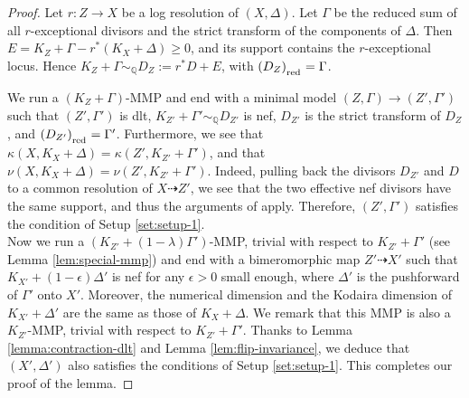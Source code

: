 \documentclass[12pt]{amsart}
\newcommand{\mbQ}{\mathbb{Q}}
\newcommand{\<}{\leq}
\def\>{\geq}
\newcommand{\bir}{\dashrightarrow}
\newcommand{\D}{\Delta}
\theoremstyle{remark}
\theoremstyle{definition}
\theoremstyle{definition}
\numberwithin{equation}{section}
\theoremstyle{definition}
\theoremstyle{definition}
\def\red{\operatorname{\textsubscript{\rm red}}}
\begin{document}
\begin{proof}
Let $r\colon Z\to X$ be a log resolution of $(X,\Delta)$. 
Let $\Gamma$ be the reduced sum of all $r$-exceptional divisors and the strict transform of the components of $\Delta$. 
Then $E = K_Z+\Gamma - r^*(K_X+\Delta) \> 0$, and its support contains the $r$-exceptional locus. 
Hence  $K_Z+\Gamma \sim_\mathbb{Q} D_Z := r^*D + E$, with $(D_Z)_{\red} = \Gamma$. 

 
We run a $(K_Z+\Gamma)$-MMP and end with a minimal model $(Z, \Gamma)\to (Z', \Gamma')$ such that $(Z',\Gamma')$ is dlt, $K_{Z'}+\Gamma'\sim_{\mbQ} D_{Z'}$ is nef,    $D_{Z'}$ is the strict transform of $D_Z$,   
and $(D_{Z'})_{\red} = \Gamma'$. 
Furthermore, we see that   $\kappa(X, K_X+\Delta) = \kappa(Z', K_{Z'}+\Gamma')$, and that $\nu(X, K_X+\Delta) = \nu(Z', K_{Z'}+\Gamma')$. 
Indeed,  pulling back the   divisors $D_{Z'}$ and $D$ to a common resolution of $X\bir Z'$, 
we see that the two effective nef divisors have the same support, 
and thus the arguments of \cite[Lemma 11.3.3]{Kol92} apply.  
Therefore, $(Z',\Gamma')$ satisfies the condition of Setup \ref{set:setup-1}. 
\\

Now we run a $(K_{Z'}+(1-\lambda)\Gamma')$-MMP, trivial with respect to $K_{Z'}+\Gamma'$ (see Lemma  \ref{lem:special-mmp}) and end with a bimeromorphic map $Z'\bir X'$ such that $K_{X'}+(1-\epsilon)\Delta'$ is nef for any $\epsilon>0$ small enough,  where $\Delta'$ is the pushforward of $\Gamma'$ onto $X'$. 
Moreover, the numerical dimension and the Kodaira dimension of $K_{X'}+\D'$ are the same as those of $K_X+\D$. 
We remark that this  MMP is also a $K_{Z'}$-MMP, trivial with respect to $K_{Z'}+\Gamma'$.
Thanks to Lemma \ref{lemma:contraction-dlt} and Lemma \ref{lem:flip-invariance}, we deduce that $(X',\D')$ also satisfies the conditions of  Setup \ref{set:setup-1}. 
This completes our proof of the lemma. 
\end{proof}
\end{document}
